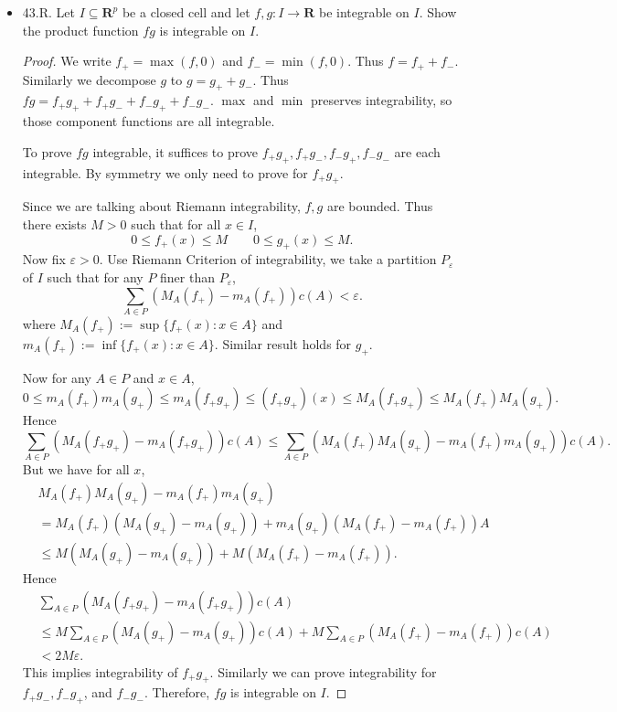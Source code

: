 \begin{itemize}
\begin{proof}
	Now
	\[
		\int_I |f| = \int _I f_+ - f_- = \int _E f_+ - \int _{I \setminus E} f_-
	.\] 
	where $E = \{x: f(x) \ge 0\} $.
	By boundedness of $f$, $f_+ \le M$ and $f_- \ge -M$. Hence
	\[
		\int _I |f| \le \int _E M - \int _{I \setminus E} -M = \int _I M =  M c(I)
	.\] 
\end{proof}
\newpage

\item 43.R. Let $I \subseteq \boldsymbol{R}^p$ be a closed cell and let $f, g: I \rightarrow \boldsymbol{R}$ be integrable on $I$. Show the product function $f g$ is integrable on $I$.
\begin{proof}
	We write $f_+ = \max (f, 0)$ and $f_- = \min(f, 0)$. Thus $f = f_+ + f_-$. Similarly we decompose $g$ to $g = g_+ + g_-$. Thus $fg = f_+ g_+ + f_+ g_- + f_- g_+ + f _- g_-$. $\max$ and $\min$ preserves integrability, so those component functions are all integrable.

	To prove $fg$ integrable, it suffices to prove $f_+ g_+ , f_+ g_- , f_- g_+ , f _- g_-$ are each integrable. By symmetry we only need to prove for $f_+ g_+$.

	Since we are talking about Riemann integrability, $f, g$ are bounded. Thus there exists $M >0$ such that for all $x \in I$, 
	\[
		0\le f_+(x) \le M\qquad
		0\le g_+(x) \le M
	.\] 
	Now fix $\varepsilon>0$. Use Riemann Criterion of integrability, we take a partition $P_\varepsilon$ of $I$ such that for any $P$ finer than $P_\varepsilon$, 
	\[
		\sum_{A \in P} (M_A(f_+) - m_A(f_+)) c(A) < \varepsilon
	.\] 
	where $M_A(f_+) := \operatorname{sup} \{f_+(x) : x \in A\} $ and $m_A(f_+) := \operatorname{inf} \{f_+(x) : x \in A\} $. Similar result holds for $g_+$.

	Now for any $A \in P$ and $x \in A$,
	\[
		0\le m_A(f_+) m_A(g_+)\le m_A(f_+g_+) 
		\le (f_+g_+)(x) \le M_A(f_+g_+)
		\le M_A(f_+)M_A(g_+)
	.\] 
	Hence
	\[
		\sum_{A \in P} (M_A(f_+g_+) - m_A(f_+g_+)) c(A)  
		\le \sum_{A \in P} (M_A(f_+)M_A(g_+) - m_A(f_+)m_A(g_+)) c(A)  
	.\] 
	But we have for all $x$,
\begin{align*}
	&M_A(f_+)M_A(g_+) - m_A(f_+)m_A(g_+) \\
	&= M_A(f_+) \left( M_A(g_+) - m_A(g_+) \right) +
	m_A(g_+) \left( M_A(f_+) - m_A(f_+) \right) A\\
	&\le M \left( M_A(g_+) - m_A(g_+) \right) + M\left(M_A(f_+ ) - m_A(f_+)\right) 
.\end{align*} 
Hence
\begin{align*}
		&\sum_{A \in P} (M_A(f_+g_+) - m_A(f_+g_+)) c(A)  \\
		&\le M \sum_{A \in P} \left( M_A(g_+) - m_A(g_+) \right) c(A) +
		M \sum_{A \in P} \left( M_A(f_+) - m_A(f_+) \right) c(A)\\
		&< 2 M \varepsilon
.\end{align*}
This implies integrability of $f_+ g_+$. Similarly we can prove integrability for $f_+ g_- , f_- g_+ $, and $f _- g_-$. Therefore, $fg$ is integrable on $I$.
\end{proof}
\newpage


\end{itemize}
